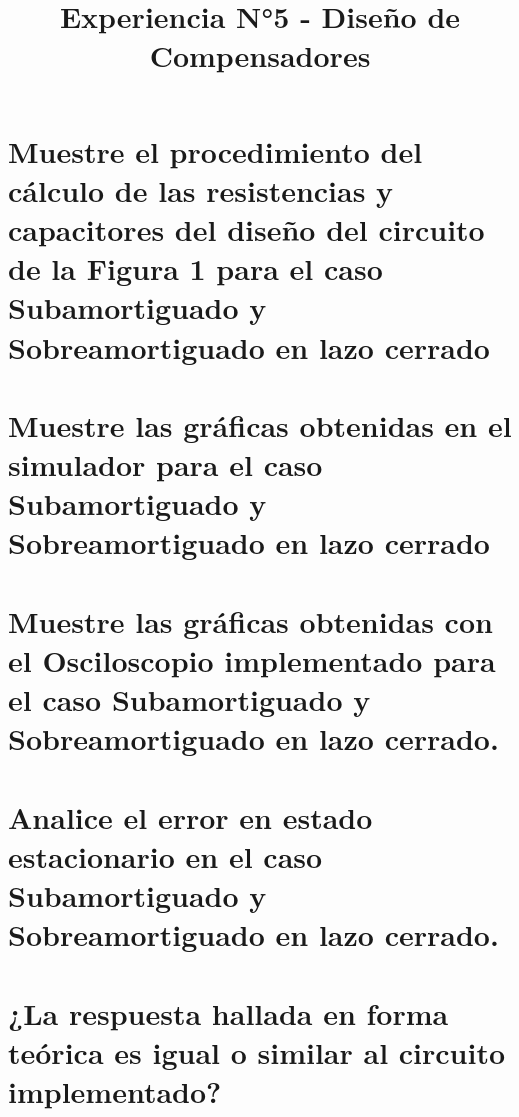 \documentclass[conference]{IEEEtran}
\begin{document}
	
	\title{Experiencia N°5 - Diseño de Compensadores}
	
	\author{
		\and
		\and
	}
	\maketitle
	
	\begin{abstract}
		
	\end{abstract}
	
	\begin{IEEEkeywords}
		
	\end{IEEEkeywords}
	
	 \section{Muestre el procedimiento del cálculo de las resistencias y capacitores del diseño del circuito de la Figura 1 para el caso Subamortiguado y Sobreamortiguado en lazo cerrado}
	 \section{Muestre las gráficas obtenidas en el simulador para el caso Subamortiguado y Sobreamortiguado en lazo cerrado}
	 \section{Muestre las gráficas obtenidas con el Osciloscopio implementado para el caso Subamortiguado y Sobreamortiguado en lazo cerrado.}
	 \section{Analice el error en estado estacionario en el caso Subamortiguado y Sobreamortiguado en lazo cerrado.}
	 \section{¿La respuesta hallada en forma teórica es igual o similar al circuito implementado?}
	
	
\end{document}

